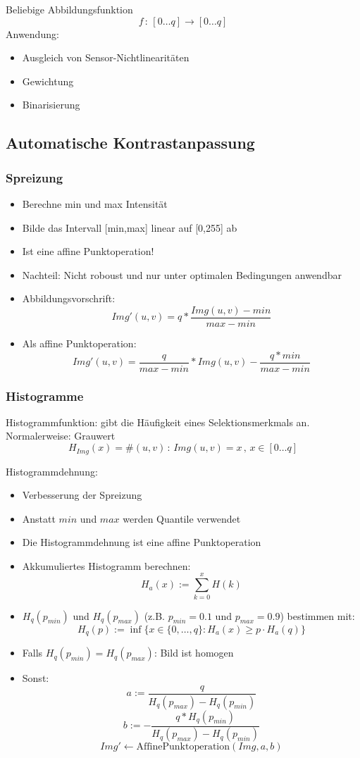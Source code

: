 Beliebige Abbildungsfunktion $$f \, : \, [0 \dots q] \to [0 \dots q]$$
Anwendung:
\begin{itemize}
\item Ausgleich von Sensor-Nichtlinearitäten
\item Gewichtung
\item Binarisierung
\end{itemize}

\subsection{Automatische Kontrastanpassung}

\subsubsection{Spreizung}
\begin{itemize}
\item Berechne min und max Intensität
\item Bilde das Intervall [min,max] linear auf [0,255] ab
\item Ist eine affine Punktoperation!
\item Nachteil: Nicht roboust und nur unter optimalen Bedingungen anwendbar
\item Abbildungsvorschrift: \[Img'(u,v) = q*\frac{Img(u,v)-min}{max-min}\]
\item Als affine Punktoperation: \[Img'(u,v) =  \frac{q}{max-min}*Img(u,v)-\frac{q*min}{max-min}\]
\end{itemize}

\subsubsection{Histogramme}

Histogrammfunktion: gibt die Häufigkeit eines Selektionsmerkmals an. Normalerweise: Grauwert
$$H_{Img}(x) = \# (u,v) \, : \, Img(u,v) = x \, , \, x \in [0 \dots q]$$

Histogrammdehnung:
\begin{itemize}
\item Verbesserung der Spreizung
\item Anstatt $min$ und $max$ werden Quantile verwendet
\item Die Histogrammdehnung ist eine affine Punktoperation
\item Akkumuliertes Histogramm berechnen: \[H_a(x):=\sum\limits_{k=0}^x H(k)\]
\item \(H_q(p_{min})\) und \(H_q(p_{max})\) (z.B. \(p_{min} = 0.1\) und \(p_{max} = 0.9\)) bestimmen mit: \[H_q(p) := \inf\{ x \in \{ 0, \dots ,q\}:H_a(x) \geq p \cdot H_a(q) \}\]
\item Falls \(H_q(p_{min}) = H_q(p_{max})\): Bild ist homogen
\item Sonst:
\[ a:=\frac{q}{H_q(p_{max}) - H_q(p_{min})} \]
\[ b:=-\frac{q*H_q(p_{min})}{H_q(p_{max}) - H_q(p_{min})} \]
\[ Img' \gets \text{AffinePunktoperation}(Img,a,b) \]
\end{itemize}

